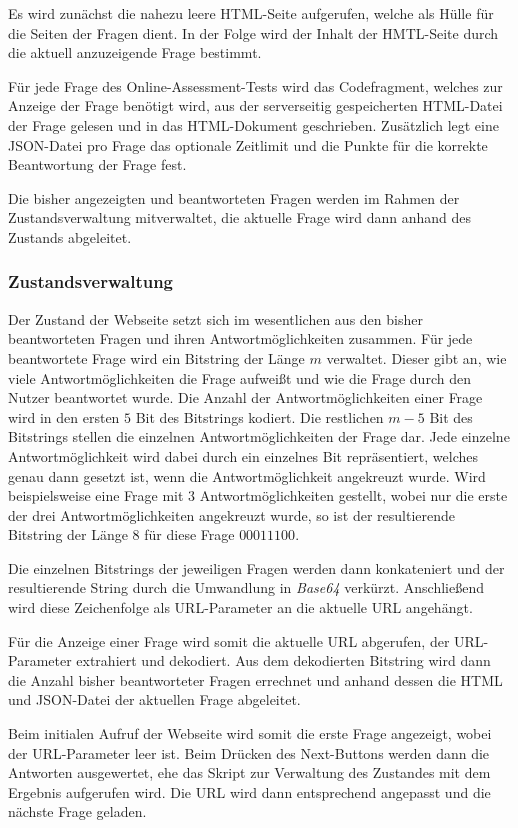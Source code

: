 Es wird zunächst die nahezu leere HTML-Seite aufgerufen, welche als Hülle für die Seiten der Fragen dient. 
In der Folge wird der Inhalt der HMTL-Seite durch die aktuell anzuzeigende Frage bestimmt.

Für jede Frage des Online-Assessment-Tests wird das Codefragment, welches zur Anzeige der Frage benötigt wird, aus der serverseitig gespeicherten HTML-Datei der Frage gelesen und in das HTML-Dokument geschrieben. 
Zusätzlich legt eine JSON-Datei pro Frage das optionale Zeitlimit und die Punkte für die korrekte Beantwortung der Frage fest.

Die bisher angezeigten und beantworteten Fragen werden im Rahmen der Zustandsverwaltung mitverwaltet, die aktuelle Frage wird dann anhand des Zustands abgeleitet.

\subsubsection{Zustandsverwaltung}

Der Zustand der Webseite setzt sich im wesentlichen aus den bisher beantworteten Fragen und ihren Antwortmöglichkeiten zusammen. 
Für jede beantwortete Frage wird ein Bitstring der Länge $m$ verwaltet. Dieser gibt an, wie viele Antwortmöglichkeiten die Frage aufweißt und wie die Frage durch den Nutzer beantwortet wurde. 
Die Anzahl der Antwortmöglichkeiten einer Frage wird in den ersten $5$ Bit des Bitstrings kodiert. 
Die restlichen $m - 5$ Bit des Bitstrings stellen die einzelnen Antwortmöglichkeiten der Frage dar. Jede einzelne Antwortmöglichkeit wird dabei durch ein einzelnes Bit repräsentiert, welches genau dann gesetzt ist, wenn die Antwortmöglichkeit angekreuzt wurde.
Wird beispielsweise eine Frage mit $3$ Antwortmöglichkeiten gestellt, wobei nur die erste der drei Antwortmöglichkeiten angekreuzt wurde, so ist der resultierende Bitstring der Länge $8$ für diese Frage $00011100$.

Die einzelnen Bitstrings der jeweiligen Fragen werden dann konkateniert und der resultierende String durch die Umwandlung in \textit{Base64} verkürzt. 
Anschließend wird diese Zeichenfolge als URL-Parameter an die aktuelle URL angehängt.
 
Für die Anzeige einer Frage wird somit die aktuelle URL abgerufen, der URL-Parameter extrahiert und dekodiert.
Aus dem dekodierten Bitstring wird dann die Anzahl bisher beantworteter Fragen errechnet und anhand dessen die HTML und JSON-Datei der aktuellen Frage abgeleitet.

Beim initialen Aufruf der Webseite wird somit die erste Frage angezeigt, wobei der URL-Parameter leer ist.
Beim Drücken des Next-Buttons werden dann die Antworten ausgewertet, ehe das Skript zur Verwaltung des Zustandes mit dem Ergebnis aufgerufen wird. 
Die URL wird dann entsprechend angepasst und die nächste Frage geladen.

